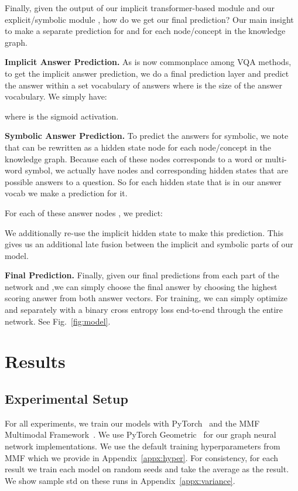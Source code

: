 \documentclass[final]{cvpr}
\providecommand{\myparagraph}[1]{\noindent\textbf{#1.}}
\providecommand{\sectionvspace}{\vspace{-0cm}}
\begin{document}
Finally, given the output of our implicit transformer-based module  and our explicit/symbolic module , how do we get our final prediction? Our main insight to make a separate prediction for  and for each node/concept in the knowledge graph.

\myparagraph{Implicit Answer Prediction}
As is now commonplace among VQA methods, to get the implicit answer prediction, we do a final prediction layer and predict the answer within a set vocabulary of answers  where  is the size of the answer vocabulary. We simply have:
 
where  is the sigmoid activation.

\myparagraph{Symbolic Answer Prediction}
To predict the answers for symbolic, we note that  can be rewritten as a hidden state node  for each node/concept  in the knowledge graph. Because each of these nodes corresponds to a word or multi-word symbol, we actually have nodes and corresponding hidden states that are possible answers to a  question. So for each hidden state that is in our answer vocab  we make a prediction for it.

For each of these answer nodes , we predict:



We additionally re-use the implicit hidden state  to make this prediction. This gives us an additional late fusion between the implicit and symbolic parts of our model.

\myparagraph{Final Prediction}
Finally, given our final predictions from each part of the network  and ,we  can simply  choose  the  final  answer  by  choosing  the  highest scoring answer from both  answer vectors. For training, we can simply optimize  and  separately with a binary cross entropy loss end-to-end through the entire network. See Fig.~\ref{fig:model}.

\sectionvspace
\section{Results}
\sectionvspace
\subsection{Experimental Setup}
\label{sec:setup}
\sectionvspace
For all experiments, we train our models with  PyTorch~\cite{paszke2019pytorch} and the MMF Multimodal Framework~\cite{singh2020mmf}. We use PyTorch Geometric~\cite{fey2019fast} for our graph neural network implementations. We use the default training hyperparameters from MMF which we provide in Appendix~\ref{appx:hyper}. For consistency, for each result we train each model on  random seeds and take the average as the result. We show sample std on these runs in Appendix~\ref{appx:variance}. 
\end{document}
